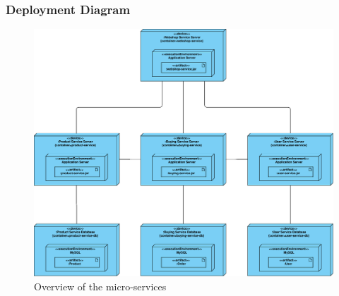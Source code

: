 \documentclass{article}
\newcommand{\namedlisting}[2][]{%
}
\newcommand*\lstinputpath[1]{\lstset{inputpath=#1}}
\begin{document}
\subsubsection{Deployment Diagram}
\begin{figure}[H]
    \centering
    \includegraphics[width=\linewidth]{img/Deployment.png}
    \caption{Overview of the micro-services}
\end{figure}


% 
% 
% 
% 
% 
% 
% 



% 
% 
\end{document}
